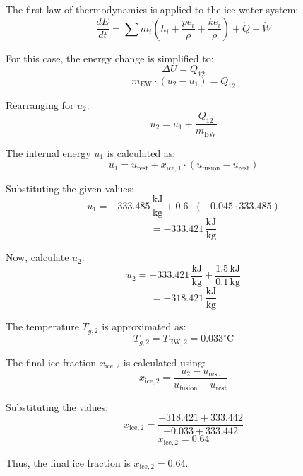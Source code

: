 The first law of thermodynamics is applied to the ice-water system:  
\[
\frac{dE}{dt} = \sum \dot{m}_i \left( h_i + \frac{pe_i}{\rho} + \frac{ke_i}{\rho} \right) + \dot{Q} - \dot{W}
\]  

For this case, the energy change is simplified to:  
\[
\Delta U = Q_{12}
\]  
\[
m_{\text{EW}} \cdot (u_2 - u_1) = Q_{12}
\]  

Rearranging for \( u_2 \):  
\[
u_2 = u_1 + \frac{Q_{12}}{m_{\text{EW}}}
\]  

The internal energy \( u_1 \) is calculated as:  
\[
u_1 = u_{\text{rest}} + x_{\text{ice},1} \cdot (u_{\text{fusion}} - u_{\text{rest}})
\]  

Substituting the given values:  
\[
u_1 = -333.485 \, \frac{\text{kJ}}{\text{kg}} + 0.6 \cdot (-0.045 \cdot 333.485)
\]  
\[
= -333.421 \, \frac{\text{kJ}}{\text{kg}}
\]  

Now, calculate \( u_2 \):  
\[
u_2 = -333.421 \, \frac{\text{kJ}}{\text{kg}} + \frac{1.5 \, \text{kJ}}{0.1 \, \text{kg}}
\]  
\[
= -318.421 \, \frac{\text{kJ}}{\text{kg}}
\]  

The temperature \( T_{g,2} \) is approximated as:  
\[
T_{g,2} = T_{\text{EW},2} = 0.033^\circ\text{C}
\]  

The final ice fraction \( x_{\text{ice},2} \) is calculated using:  
\[
x_{\text{ice},2} = \frac{u_2 - u_{\text{rest}}}{u_{\text{fusion}} - u_{\text{rest}}}
\]  

Substituting the values:  
\[
x_{\text{ice},2} = \frac{-318.421 + 333.442}{-0.033 + 333.442}
\]  
\[
x_{\text{ice},2} = 0.64
\]  

Thus, the final ice fraction is \( x_{\text{ice},2} = 0.64 \).